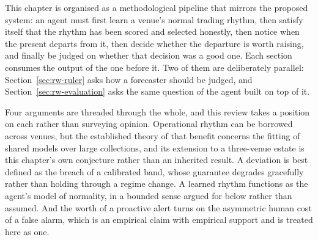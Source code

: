 %
%

This chapter is organised as a methodological pipeline that mirrors the
proposed system: an agent must first learn a venue's normal trading rhythm,
then satisfy itself that the rhythm has been scored and selected honestly, then
notice when the present departs from it, then decide whether the departure is
worth raising, and finally be judged on whether that decision was a good one.
Each section consumes the output of the one before it. Two of them are
deliberately parallel: Section~\ref{sec:rw-ruler} asks how a forecaster should
be judged, and Section~\ref{sec:rw-evaluation} asks the same question of the
agent built on top of it.

Four arguments are threaded through the whole, and this review takes a position
on each rather than surveying opinion. Operational rhythm can be borrowed
across venues, but the established theory of that benefit concerns the fitting
of shared models over large collections, and its extension to a three-venue
estate is this chapter's own conjecture rather than an inherited result. A
deviation is best defined as the breach of a calibrated band, whose guarantee
degrades gracefully rather than holding through a regime change. A learned
rhythm functions as the agent's model of normality, in a bounded sense argued
for below rather than assumed. And the worth of a proactive alert turns on the
asymmetric human cost of a false alarm, which is an empirical claim with
empirical support and is treated here as one.

